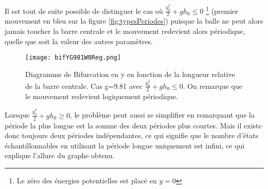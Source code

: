 \documentclass[a4paper]{report}
\begin{document}
Il est tout de suite possible de distinguer le cas où \(\frac{\dot{y}_0^2}{2} + gh_0 \leq 0\) \footnote{Le zéro des énergies potentielles est placé en \(y=0\)} (premier mouvement en bleu sur la figure \ref{fig:typesPeriodes}) puisque la balle ne peut alors jamais toucher la barre centrale et le mouvement redevient alors périodique, quelle que soit la valeur des autres paramètres.
\begin{figure}[h!]
   \texttt{[image: bifYG981W0Reg.png]}
      \caption[Diagramme de Bifurcation en y: g=9.81  \(\; \frac{\dot{y}_0^2}{2} + gh_0 \leq 0\)]{Diagramme de Bifurcation en y en fonction de la longueur relative de la barre centrale. Cas g=9.81 avec \(\frac{\dot{y}_0^2}{2} + gh_0 \leq 0\). On remarque que le mouvement redevient logiquement périodique.}
\end{figure}
Lorsque \(\frac{\dot{y}_0^2}{2} + gh_0 \geq 0\), le problème peut aussi se simplifier en remarquant que la période la plus longue est la somme des deux périodes plus courtes\label{propr:sommePeriodes}. Mais il existe donc toujours deux périodes indépendantes, ce qui signifie que le nombre d'états échantillonnables en utilisant la période longue uniquement est infini, ce qui explique l'allure du graphe obtenu.
\end{document}
